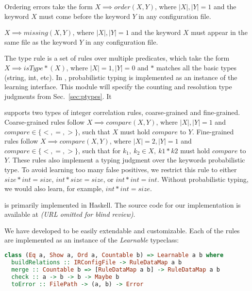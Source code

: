 Ordering errors take the form $X \implies order(X,Y)$, where $|X|,|Y|=1$ and the keyword $X$ must come before the keyword $Y$ in any configuration file.

$X \implies missing(X,Y)$, where $|X|,|Y|=1$ and the keyword $X$ must appear in the same file as the keyword $Y$ in any configuration file.

The type rule is a set of rules over multiple predicates, which take the form $X \implies isType\ast(X)$, where $|X|=1, |Y|=0$ and $\ast$ matches all the basic types (string, int, etc).
In \app, probabilistic typing is implemented as an instance of the learning interface.
This module will specify the counting and resolution type judgments from Sec.~\ref{sec:ptypes}.
It 

\app supports two types of integer correlation rules, coarse-grained and fine-grained.
Coarse-grained rules follow $X \implies compare(X,Y)$, where $|X|,|Y|=1$ and $compare \in \{<,=,>\}$, such that $X$ must hold $compare$ to $Y$.
Fine-grained rules follow $X \implies compare(X,Y)$, where $|X|=2,|Y|=1$ and $compare \in \{<,=,>\}$, such that for $k_1,\ k_2 \in X,\ k1*k2$ must hold $compare$ to $Y$.
These rules also implement a typing judgment over the keywords probabilistic type.
To avoid learning too many false positives, we restrict this rule to either $size*int=size$, $int*size=size$, or $int*int = int$.
Without probabilistic typing, we would also learn, for example, $int*int=size$.

\app is primarily implemented in Haskell.
The source code for our implementation is available at {\em (URL omitted for blind review)}.

We have developed \app to be easily extendable and customizable. Each of the rules are implemented as an instance of the \textit{Learnable} typeclass:

\begin{lstlisting}[language=Haskell, xleftmargin=.01\textwidth]
class (Eq a, Show a, Ord a, Countable b) => Learnable a b where
  buildRelations :: IRConfigFile -> RuleDataMap a b
  merge :: Countable b => [RuleDataMap a b] -> RuleDataMap a b
  check :: a -> b -> b -> Maybe b
  toError :: FilePath -> (a, b) -> Error
\end{lstlisting} 

